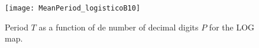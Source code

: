 %
%
\begin{figure}
\texttt{[image: MeanPeriod\_logisticoB10]}
\caption{Period $T$ as a function of de number of decimal digits $P$ for the LOG map.} \label{fig:perio}
\end{figure}




